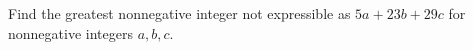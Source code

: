 Find the greatest nonnegative integer not expressible as $5a+23b+29c$ for nonnegative integers $a,b,c$.

